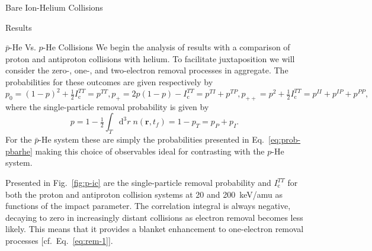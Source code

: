 \documentclass[a5paper, 9 pt]{extreport}
\begin{document}
\begin{chapter}{Bare Ion-Helium Collisions \label{chap:p-he2p-he}}
\begin{section}{Results \label{sec:phe2p-res}}
\begin{subsection}{ \texorpdfstring{$\bar{p}$}{pbar}-He Vs. \texorpdfstring{$p$}{p}-He Collisions
                         \label{sec:pbarhe-res}}
         We begin the analysis of results with a comparison of proton and antiproton collisions with
         helium. To facilitate juxtaposition we will consider the zero-, one-, and two-electron removal
         processes in aggregate. The probabilities for these outcomes are given respectively by
         \begin{subequations} \label{eq:remove}
            \begin{equation} \label{eq:rem-0}
               p_0 = (1 - p)^2 + \tfrac{1}{2} I^{TT}_\mathrm{c} = p^{TT},
            \end{equation}
            \begin{equation} \label{eq:rem-1}
               p_+ = 2 p (1-p) - I^{TT}_\mathrm{c} = p^{TI} + p^{TP},
            \end{equation}
            \begin{equation} \label{eq:rem-2}
               p_{++} = p^2 + \tfrac{1}{2} I^{TT}_\mathrm{c} = p^{II} + p^{IP} + p^{PP},
            \end{equation}
         \end{subequations}
         where the single-particle removal probability is given by
         \begin{equation} \label{eq:p-rem}
            p = 1 - \tfrac{1}{2} \int_T \mathrm{d}^3 r \; n(\mathbf{r},t_f)
            = 1 - p_T = p_P + p_I.
         \end{equation}
         For the $\bar{p}$-He system these are simply the probabilities presented in
         Eq.~\eqref{eq:prob-pbarhe} making this choice of observables ideal for contrasting with the
         $p$-He system.

         Presented in Fig.~\ref{fig:p-ic} are the single-particle removal probability and
         $I^{TT}_\mathrm{c}$ for both the proton and antiproton collision systems at 20 and 200~keV/amu
         as functions of the impact parameter. The correlation integral is always negative, decaying to
         zero in increasingly distant collisions as electron removal becomes less likely. This means
         that it provides a blanket enhancement to one-electron removal processes
         [cf.\ Eq.~\eqref{eq:rem-1}].


\end{subsection}
\end{section}
\end{chapter}
\end{document}

